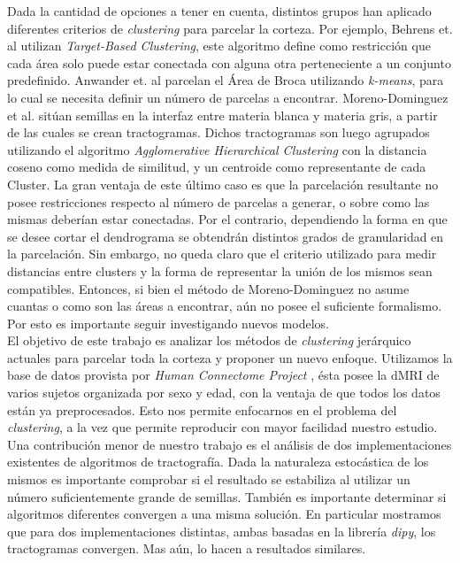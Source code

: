 Dada la cantidad de opciones a tener en cuenta, distintos grupos han aplicado
diferentes criterios de \textit{clustering} para parcelar la corteza. Por ejemplo,
Behrens et. al \cite{Behrens2003} utilizan \textit{Target-Based Clustering}, este
algoritmo define como restricci\'on que cada \'area solo puede estar conectada con
alguna otra perteneciente a un conjunto predefinido. Anwander et. al \cite{Anwander2006} 
parcelan el \'Area de Broca utilizando \textit{k-means}, para lo cual se necesita
definir un n\'umero de parcelas a encontrar. Moreno-Dominguez et al. 
\cite{Moreno-Dominguez2014} sit\'uan semillas en la interfaz entre materia blanca
y materia gris, a partir de las cuales se crean tractogramas. Dichos tractogramas
son luego agrupados utilizando el algoritmo \textit{Agglomerative Hierarchical
Clustering} con la distancia coseno como medida de similitud, y un centroide como
representante de cada Cluster. La gran ventaja de este \'ultimo caso es que la
parcelaci\'on resultante no posee restricciones respecto al n\'umero de parcelas
a generar, o sobre como las mismas deber\'ian estar conectadas. Por el contrario,
dependiendo la forma en que se desee cortar el dendrograma se obtendr\'an
distintos grados de granularidad en la parcelaci\'on. Sin embargo, no queda claro
que el criterio utilizado para medir distancias entre clusters y la forma de
representar la uni\'on de los mismos sean compatibles. Entonces, si bien el
m\'etodo de Moreno-Dominguez no asume cuantas o como son las \'areas a encontrar,
a\'un no posee el suficiente formalismo. Por esto es importante seguir investigando
nuevos modelos.  \\

El objetivo de este trabajo es analizar los m\'etodos de \textit{clustering} 
jer\'arquico actuales para parcelar toda la corteza y proponer un nuevo enfoque. 
Utilizamos la base de datos provista por \textit{Human Connectome Project} 
\cite{VanEssen2012}, \'esta posee la dMRI de varios sujetos organizada por sexo 
y edad, con la ventaja de que todos los datos est\'an ya preprocesados. Esto nos
permite enfocarnos en el problema del \textit{clustering}, a la vez que permite
reproducir con mayor facilidad nuestro estudio. \\

Una contribuci\'on menor de nuestro trabajo es el an\'alisis de dos 
implementaciones existentes de algoritmos de tractograf\'ia. Dada la naturaleza
estoc\'astica de los mismos es importante comprobar si el resultado se estabiliza
al utilizar un n\'umero suficientemente grande de semillas. Tambi\'en es importante
determinar si algoritmos diferentes convergen a una misma soluci\'on.
En particular mostramos que para dos implementaciones distintas, ambas basadas 
en la librer\'ia \textit{dipy}, los tractogramas convergen. Mas a\'un, lo hacen
a resultados similares. \\

